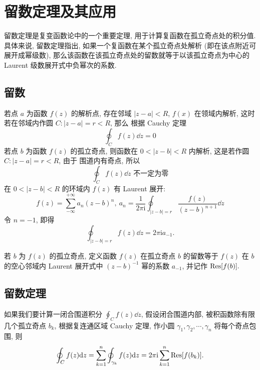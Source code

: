 \section{留数定理及其应用}

留数定理是复变函数论中的一个重要定理, 用于计算复函数在孤立奇点处的积分值. 
具体来说, 留数定理指出, 如果一个复函数在某个孤立奇点处解析 (即在该点附近可展开成幂级数), 
那么该函数在该孤立奇点处的留数就等于以该孤立奇点为中心的 Laurent 级数展开式中负幂次的系数. 

\subsection{留数}

若点 $a$ 为函数 $f(z)$ 的解析点, 存在邻域 $|z-a|<R$, $f(x)$ 在领域内解析, 这时若在邻域内作圆
$C:|z-a|=r<R$, 那么 根据 Cauchy 定理
$$\oint_{C}f(z)\dd z=0$$
若点 $b$ 为函数 $f(z)$ 的孤立奇点, 则函数在 $0<|z-b|<R$ 内解析, 这是若作圆 $C:|z-a|=r<R$, 由于
围道内有奇点, 所以 $$\oint_C f(z)\dd z\text{ 不一定为零}$$
在 $0<|z-b|<R$ 的环域内 $f(z)$ 有 Laurent 展开:
$$f(z)=\sum_{-\infty}^{+\infty}a_n(z-b)^n,~a_n=\dfrac{1}{2\pi\mathrm{i}}\oint_{|z-b|=r}\dfrac{f(z)}{(z-b)^{n+1}}\dd z$$
令 $n=-1$, 即得 $$\oint_{|z-b|=r}f(z)\dd z=2\pi\mathrm{i}a_{-1}.$$

\begin{definition}[留数]
    若 $b$ 为 $f(z)$ 的孤立奇点, 定义函数 $f(z)$ 在孤立奇点 $b$ 的留数等于 $f(z)$ 在 $b$ 的空心邻域内 Laurent
    展开式中 $(z-b)^{-1}$ 幂的系数 $a_{-1}$, 并记作 $\Res[f(b)].$
\end{definition}

\subsection{留数定理}

如果我们要计算一闭合围道积分 $\displaystyle\oint_{C}f(z)\dd z$, 假设闭合围道内部, 被积函数除有限几个孤立奇点 $b_k$, 
根据复连通区域 Cauchy 定理, 作小圆 $\gamma_1,\gamma_2,\cdots,\gamma_{n}$ 将每个奇点包围, 则
$$\oint_{C}f(z)\dd z=\sum_{k=1}^{n}\oint_{\gamma_k}f(z)\dd z=2\pi\i\sum_{k=1}^{n}\Res[f(b_k)].$$

